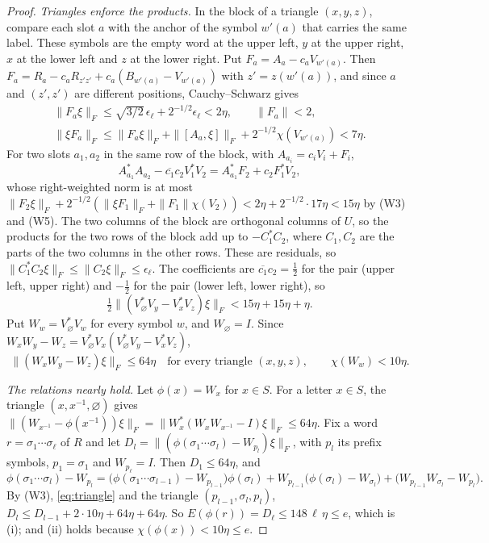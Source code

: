 \begin{proof}
\emph{Triangles enforce the products.} In the block of a triangle $(x,y,z)$, compare each slot $a$ with the anchor of the symbol $w'(a)$ that
carries the same label. These symbols are the empty word at the upper left, $y$ at the upper right, $x$ at the lower left and $z$ at the lower
right. Put
$F_a=A_a-c_aV_{w'(a)}$. Then $F_a=R_a-c_aR_{z'z'}+c_a(B_{w'(a)}-V_{w'(a)})$ with $z'=z(w'(a))$, and since $a$ and $(z',z')$ are different
positions, Cauchy--Schwarz gives
\begin{gather*}
\|F_a\xi\|_F\le\sqrt{3/2}\,\epsilon_\ell+2^{-1/2}\epsilon_\ell<2\eta,\qquad\|F_a\|<2,\\
\|\xi F_a\|_F\le\|F_a\xi\|_F+\|[A_a,\xi]\|_F+2^{-1/2}\chi(V_{w'(a)})<7\eta .
\end{gather*}
For two slots $a_1,a_2$ in the same row of the block, with $A_{a_i}=c_iV_i+F_i$,
\[
A_{a_1}^*A_{a_2}-\overline{c_1}c_2V_1^*V_2=A_{a_1}^*F_2+c_2F_1^*V_2,
\]
whose right-weighted norm is at most $\|F_2\xi\|_F+2^{-1/2}(\|\xi F_1\|_F+\|F_1\|\chi(V_2))<2\eta+2^{-1/2}\cdot17\eta<15\eta$ by (W3) and (W5). The two
columns of the block are orthogonal columns of $U$, so the products for the two rows of the block add up to $-C_1^*C_2$, where $C_1,C_2$ are the
parts of the two columns in the other rows. These are residuals, so $\|C_1^*C_2\xi\|_F\le\|C_2\xi\|_F\le\epsilon_\ell$. The coefficients are
$\overline{c_1}c_2=\frac12$ for the pair (upper left, upper right) and $-\frac12$ for the pair (lower left, lower right), so
\[
\tfrac12\|(V_\varnothing^*V_y-V_x^*V_z)\xi\|_F<15\eta+15\eta+\eta .
\]
Put $W_w=V_\varnothing^*V_w$ for every symbol $w$, and $W_\varnothing=I$. Since $W_xW_y-W_z=V_\varnothing^*V_x(V_\varnothing^*V_y-V_x^*V_z)$,
\begin{equation}\label{eq:triangle}
\|(W_xW_y-W_z)\xi\|_F\le64\eta\quad\text{for every triangle }(x,y,z),\qquad\chi(W_w)<10\eta .
\end{equation}

\emph{The relations nearly hold.} Let $\phi(x)=W_x$ for $x\in S$. For a letter $x\in S$, the triangle $(x,x^{-1},\varnothing)$ gives
$\|(W_{x^{-1}}-\phi(x^{-1}))\xi\|_F=\|W_x^*(W_xW_{x^{-1}}-I)\xi\|_F\le64\eta$. Fix a word $r=\sigma_1\cdots\sigma_\ell$ of $R$ and let
$D_l=\|(\phi(\sigma_1\cdots\sigma_l)-W_{p_l})\xi\|_F$, with $p_l$ its prefix symbols, $p_1=\sigma_1$ and $W_{p_\ell}=I$. Then $D_1\le64\eta$, and
\[
\phi(\sigma_1\cdots\sigma_l)-W_{p_l}=\bigl(\phi(\sigma_1\cdots\sigma_{l-1})-W_{p_{l-1}}\bigr)\phi(\sigma_l)+W_{p_{l-1}}\bigl(\phi(\sigma_l)-W_{\sigma_l}\bigr)+\bigl(W_{p_{l-1}}W_{\sigma_l}-W_{p_l}\bigr).
\]
By (W3), \eqref{eq:triangle} and the triangle $(p_{l-1},\sigma_l,p_l)$, $D_l\le D_{l-1}+2\cdot10\eta+64\eta+64\eta$. So
$E(\phi(r))=D_\ell\le148\,\ell\,\eta\le e$, which is (i); and (ii) holds because $\chi(\phi(x))<10\eta\le e$.


\end{proof}
